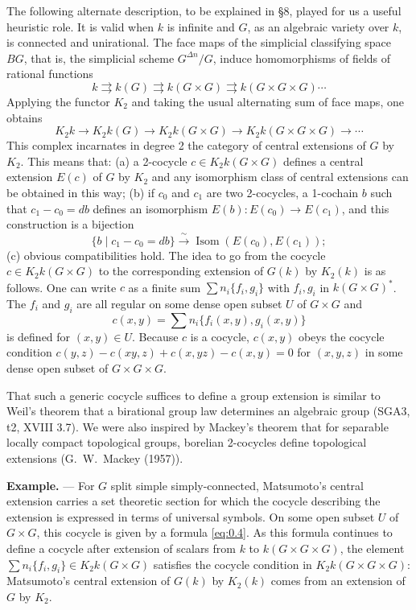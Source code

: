 \documentclass[11pt,a4paper]{article}
\theoremstyle{plain}
\theoremstyle{definition}
\DeclareMathOperator{\Isom}{Isom}
\begin{document}
The following alternate description, to be explained in \S 8, played for us a useful heuristic role. It is valid when $k$ is infinite and $G$, as an algebraic variety over $k$, is connected and unirational. The face maps of the simplicial classifying space $BG$, that is, the simplicial scheme $G^{\Delta n}/G$, induce homomorphisms of fields of rational functions
\[k \rightrightarrows k(G) \rightrightarrows k(G \times G) \rightrightarrows k(G \times G \times G) \cdots\]
Applying the functor $K_2$ and taking the usual alternating sum of face maps, one obtains
\[K_2k \to K_2k(G) \to K_2k(G \times G) \to K_2k(G \times G \times G) \to \cdots\]
This complex incarnates in degree 2 the category of central extensions of $G$ by $K_2$. This means that: (a) a 2-cocycle $c \in K_2k(G \times G)$ defines a central extension $E(c)$ of $G$ by $K_2$ and any isomorphism class of central extensions can be obtained in this way; (b) if $c_0$ and $c_1$ are two 2-cocycles, a 1-cochain $b$ such that $c_1 - c_0 = db$ defines an isomorphism $E(b): E(c_0) \to E(c_1)$, and this construction is a bijection
\[\{b \mid c_1 - c_0 = db\} \xrightarrow{\;\sim\;} \Isom(E(c_0), E(c_1));\]
(c) obvious compatibilities hold. The idea to go from the cocycle $c \in K_2k(G \times G)$ to the corresponding extension of $G(k)$ by $K_2(k)$ is as follows. One can write $c$ as a finite sum $\sum n_i\{f_i, g_i\}$ with $f_i, g_i$ in $k(G \times G)^*$. The $f_i$ and $g_i$ are all regular on some dense open subset $U$ of $G \times G$ and
\begin{equation}\label{eq:0.4}
c(x,y) = \sum n_i\{f_i(x,y), g_i(x,y)\}
\end{equation}
is defined for $(x,y) \in U$. Because $c$ is a cocycle, $c(x,y)$ obeys the cocycle condition $c(y,z) - c(xy,z) + c(x,yz) - c(x,y) = 0$ for $(x,y,z)$ in some dense open subset of $G \times G \times G$.

That such a generic cocycle suffices to define a group extension is similar to Weil's theorem that a birational group law determines an algebraic group (SGA3, t2, XVIII 3.7). We were also inspired by Mackey's theorem that for separable locally compact topological groups, borelian 2-cocycles define topological extensions (G.~W.~Mackey (1957)).

\textbf{Example.} --- For $G$ split simple simply-connected, Matsumoto's central extension carries a set theoretic section for which the cocycle describing the extension is expressed in terms of universal symbols. On some open subset $U$ of $G \times G$, this cocycle is given by a formula \eqref{eq:0.4}. As this formula continues to define a cocycle after extension of scalars from $k$ to $k(G \times G \times G)$, the element $\sum n_i\{f_i, g_i\} \in K_2k(G \times G)$ satisfies the cocycle condition in $K_2k(G \times G \times G)$: Matsumoto's central extension of $G(k)$ by $K_2(k)$ comes from an extension of $G$ by $K_2$.
\end{document}
